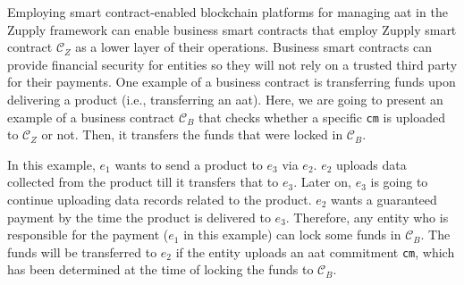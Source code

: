 Employing smart contract-enabled blockchain platforms for managing \gls{aat} in the Zupply framework can enable business smart contracts that employ Zupply smart contract $\mathcal{C}_Z$ as a lower layer of their operations. Business smart contracts can provide financial security for entities so they will not rely on a trusted third party for their payments. One example of a business contract is transferring funds upon delivering a product (i.e., transferring an \gls{aat}). Here, we are going to present an example of a business contract $\mathcal{C}_B$ that checks whether a specific \texttt{cm} is uploaded to $\mathcal{C}_Z$ or not. Then, it transfers the funds that were locked in $\mathcal{C}_B$.

In this example, $e_1$ wants to send a product to $e_3$ via $e_2$. $e_2$ uploads data collected from the product till it transfers that to $e_3$. Later on, $e_3$ is going to continue uploading data records related to the product. $e_2$ wants a guaranteed payment by the time the product is delivered to $e_3$. Therefore, any entity who is responsible for the payment ($e_1$ in this example) can lock some funds in $\mathcal{C}_B$. The funds will be transferred to $e_2$ if the entity uploads an \gls{aat} commitment \texttt{cm}, which has been determined at the time of locking the funds to $\mathcal{C}_B$.


